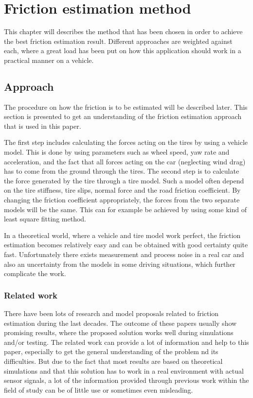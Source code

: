 \chapter{Friction estimation method}

This chapter will describes the method that has been chosen in order to achieve the best friction estimation result. Different approaches are weighted against each, where a great load has been put on how this application should work in a practical manner on a vehicle.

\section{Approach}

The procedure on how the friction is to be estimated will be described later. This section is presented to get an understanding of the friction estimation approach that is used in this paper.

The first step includes calculating the forces acting on the tires by using a vehicle model. This is done by using parameters such as wheel speed, yaw rate and acceleration, and the fact that all forces acting on the car (neglecting wind drag) has to come from the ground through the tires. The second step is to calculate the force generated by the tire through a tire model. Such a model often depend on the tire stiffness, tire slips, normal force and the road friction coefficient. By changing the friction coefficient appropriately, the forces from the two separate models will be the same. This can for example be achieved by using some kind of least square fitting method. 

In a theoretical world, where a vehicle and tire model work perfect, the friction estimation becomes relatively easy and can be obtained with good certainty quite fast. Unfortunately there exists measurement and process noise in a real car and also an uncertainty from the models in some driving situations, which further complicate the work.


\subsection{Related work}

There have been lots of research and model proposals related to friction estimation during the last decades. The outcome of these papers usually show promising results, where the proposed solution works well during simulations and/or testing. The related work can provide a lot of information and help to this paper, especially to get the general understanding of the problem nd its difficulties. But due to the fact that most results are based on theoretical simulations and that this solution has to work in a real environment with actual sensor signals, a lot of the information provided through previous work within the field of study can be of little use or sometimes even misleading.


